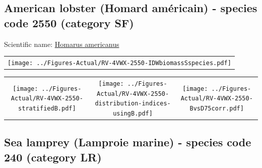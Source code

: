 \documentclass[12pt]{article}\usepackage[]{graphicx}\usepackage[]{color}
\begin{document}
\renewcommand\thefigure{\thesubsection\Alph{figure}}

\setcounter{figure}{0}

\hypertarget{sec:2550}{%
\subsection{American lobster (Homard américain) - species code 2550 (category SF)}\label{sec:2550}}

  


Scientific name: \href{http://www.marinespecies.org/aphia.php?p=taxdetails\&id=156134}{Homarus americanus} \newline
\begin{minipage}{1.0\textwidth}
 \begin{tabular}{c}
\texttt{[image: ../Figures-Actual/RV-4VWX-2550-IDWbiomassSspecies.pdf]} \\ 
\end{tabular} 
\end{minipage}
\newline

\vspace{1cm}
\begin{minipage}{1.0\textwidth}
 \begin{tabular}{ccc}
\texttt{[image: ../Figures-Actual/RV-4VWX-2550-stratifiedB.pdf]} & 
\texttt{[image: ../Figures-Actual/RV-4VWX-2550-distribution-indices-usingB.pdf]} & 
\texttt{[image: ../Figures-Actual/RV-4VWX-2550-BvsD75corr.pdf]} \\ 
\end{tabular} 
\end{minipage}
\clearpage

\renewcommand\thefigure{\thesubsection\Alph{figure}}

\setcounter{figure}{0}

\hypertarget{sec:240}{%
\subsection{Sea lamprey (Lamproie marine) - species code 240 (category LR)}\label{sec:240}}
\end{document}
